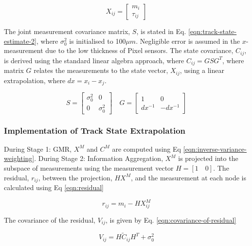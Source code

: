 \begin{equation}
X_{ij} = \begin{bmatrix} m_i \\ \tau_{ij} \end{bmatrix}
\label{eqn:track-state-estimate}
\end{equation}


The joint measurement covariance matrix, $S$, is stated in Eq. \eqref{eqn:track-state-estimate-2}, where $\sigma_0^{2}$ is initialised to 100$\mu m$. Negligible error is assumed in the $x$-measurement due to the low thickness of Pixel sensors. The state covariance, $C_{ij}$, is derived using the standard linear algebra approach, where $C_{ij} = GSG^T$, where matrix $G$ relates the measurements to the state vector, $X_{ij}$, using a linear extrapolation, where $dx = x_i - x_j$.  

\begin{equation}
S = \begin{bmatrix} \sigma_0^{2} & 0 \\ 0 & \sigma_0^{2} \end{bmatrix}  \quad G = \begin{bmatrix} 1 & 0 \\ dx^{-1} & -dx^{-1}  \end{bmatrix}
\label{eqn:track-state-estimate-2}
\end{equation}


\subsubsection{Implementation of Track State Extrapolation}

During Stage 1: GMR, $X^{M}$ and $C^{M}$ are computed using Eq \eqref{eqn:inverse-variance-weighting}. During Stage 2: Information Aggregation, $X^M$ is projected into the subspace of measurements using the measurement vector $H = [1 \quad 0]$. The residual, $r_{ij}$, between the projection, $HX^M$, and the measurement at each node is calculated using Eq \eqref{eqn:residual}

\begin{equation}
r_{ij} = m_i - HX_{ij}^M
\label{eqn:residual}
\end{equation}

The covariance of the residual, $V_{ij}$, is given by Eq. \eqref{eqn:covariance-of-residual}

\begin{equation}
{V}_{ij} = H \widetilde{C}_{ij} H^{T} + \sigma_{0}^{2}
\label{eqn:covariance-of-residual}
\end{equation}

